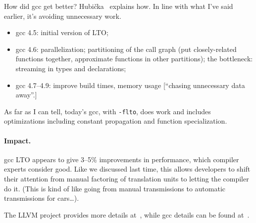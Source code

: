 How did gcc get better?
Hubi\v{c}ka~\cite{hubicka15:_link_gcc} explains how. In line with what I've said earlier, it's
avoiding unnecessary work.
\begin{itemize}[noitemsep]
\item gcc 4.5: initial version of LTO;
\item gcc 4.6: parallelization; partitioning of the call graph (put closely-related functions together, approximate functions in other partitions); the bottleneck: streaming in types and declarations;
\item gcc 4.7--4.9: improve build times, memory usage [``chasing unnecessary data away''.]
\end{itemize}
As far as I can tell, today's gcc, with {\tt -flto}, does work and includes
optimizations including constant propagation and function
specialization.

\paragraph{Impact.} gcc LTO appears to give 3--5\% improvements in performance, which compiler experts consider good.
Like we discussed last time, this allows developers to shift their attention from 
manual factoring of translation units to letting the compiler do it. (This is kind of like going
from manual transmissions to automatic transmissions for cars\ldots).

The LLVM project provides more details at~\cite{project17:_llvm_link_time_optim}, while gcc details
can be found at~\cite{novillo09:_linkt}.





